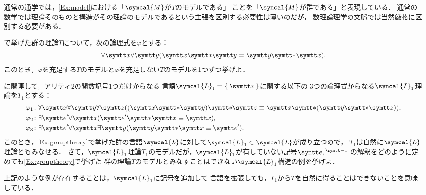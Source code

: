 
\begin{Note}
	通常の通学では，\cref{Ex:model}における「\(\symcal{M}\)が\(T\)のモデルである」
	ことを「\(\symcal{M}\)が群である」と表現している．
	通常の数学では理論そのものと構造がその理論のモデルであるという主張を区別する必要性は薄いのだが，
	数理論理学の文脈では当然厳格に区別する必要がある．
\end{Note}

\begin{Que} \label{Que:model}
	で挙げた群の理論\(T\)について，次の論理式を\(\varphi\)とする：
	\[
		\forall \obj{x} \forall \obj{y} \paren{\obj{x} \obj{\ast} \obj{y} = \obj{y} \obj{\ast} \obj{x}}.
	\]
	このとき，\(\varphi\)を充足する\(T\)のモデルと\(\varphi\)を充足しない\(T\)のモデルを1つずつ挙げよ．
\end{Que}

\begin{Que} \label{Que:grouptheoryaxiomize}
	に関連して，アリティ2の関数記号1つだけからなる
	言語\(\symcal{L}_1 = \Set{\obj{\ast}}\)に関する以下の
	3つの論理式からなる\(\symcal{L}_1\)理論を\(T_1\)とする：
	\begin{align*}
		\varphi_1 \colon & \forall \obj{x} \forall \obj{y} \forall \obj{z}
		\paren{\paren{\obj{x} \obj{\ast} \obj{y}} \obj{\ast} \obj{z} \objeq \obj{x} \obj{\ast} \paren{\obj{y} \obj{\ast} \obj{z}}}, \\
		\varphi_2 \colon & \exists \obj{e'} \forall \obj{x} \paren{\obj{e'} \obj{\ast} \obj{x} \objeq \obj{x}},                     \\
		\varphi_3 \colon & \exists \obj{e'}\forall \obj{x} \exists \obj{y} \paren{\obj{y} \obj{\ast} \obj{x} \objeq \obj{e'}}.
	\end{align*}
	このとき，\cref{Ex:grouptheory}で挙げた群の言語\(\symcal{L}\)に対して\(\symcal{L}_1 \subset \symcal{L}\)が成り立つので，
	\(T_1\)は自然に\(\symcal{L}\)理論ともみなせる．
	さて，\(\symcal{L}_1\)理論\(T_1\)のモデルだが，\(\symcal{L}_1\)が有していない記号\(\obj{e}, {}^{\obj{-1}}\)
	の解釈をどのように定めても\cref{Ex:grouptheory}で挙げた
	群の理論\(T\)のモデルとみなすことはできない\(\symcal{L}_1\)構造の例を挙げよ．

	上記のような例が存在することは，\(\symcal{L}_1\)に記号を追加して
	言語を拡張しても，\(T_1\)から\(T\)を自然に得ることはできないことを意味している．
\end{Que}



